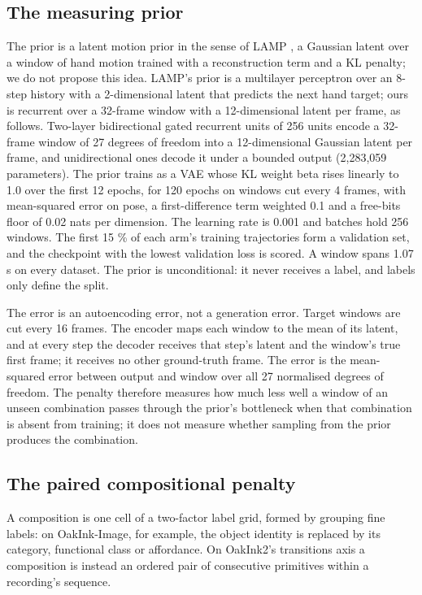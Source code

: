 \documentclass[10pt]{article}
\begin{document}
\subsection{The measuring prior}

The prior is a latent motion prior in the sense of LAMP \citep{yang2026lamp}, a Gaussian latent over a window of hand motion trained with a reconstruction term and a KL penalty; we do not propose this idea. LAMP's prior is a multilayer perceptron over an 8-step history with a 2-dimensional latent that predicts the next hand target; ours is recurrent over a 32-frame window with a 12-dimensional latent per frame, as follows. Two-layer bidirectional gated recurrent units \citep{cho2014learning} of 256 units encode a 32-frame window of 27 degrees of freedom into a 12-dimensional Gaussian latent per frame, and unidirectional ones decode it under a bounded output (2,283,059 parameters). The prior trains as a VAE \citep{kingma2014auto} whose KL weight beta \citep{higgins2017beta} rises linearly to 1.0 over the first 12 epochs, for 120 epochs on windows cut every 4 frames, with mean-squared error on pose, a first-difference term weighted 0.1 and a free-bits floor \citep{kingma2016improved} of 0.02 nats per dimension. The learning rate is 0.001 and batches hold 256 windows. The first 15 \% of each arm's training trajectories form a validation set, and the checkpoint with the lowest validation loss is scored. A window spans 1.07 s on every dataset. The prior is unconditional: it never receives a label, and labels only define the split.

The error is an autoencoding error, not a generation error. Target windows are cut every 16 frames. The encoder maps each window to the mean of its latent, and at every step the decoder receives that step's latent and the window's true first frame; it receives no other ground-truth frame. The error is the mean-squared error between output and window over all 27 normalised degrees of freedom. The penalty therefore measures how much less well a window of an unseen combination passes through the prior's bottleneck when that combination is absent from training; it does not measure whether sampling from the prior produces the combination.

\subsection{The paired compositional penalty}

A composition is one cell of a two-factor label grid, formed by grouping fine labels: on OakInk-Image, for example, the object identity is replaced by its category, functional class or affordance. On OakInk2's transitions axis a composition is instead an ordered pair of consecutive primitives within a recording's sequence.
\end{document}
